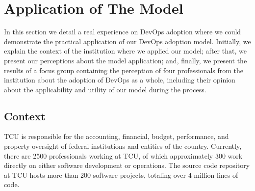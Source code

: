 \section{Application of The Model} \label{sec:TCU}

{
\color{blue}
In this section we detail a real experience on DevOps adoption where we could
demonstrate the practical application of our DevOps adoption model. Initially,
we explain the context of the institution where we applied our model; after that,
we present our perceptions about the model application; and,
finally, we present the results of a focus group containing the perception of
four professionals from the institution about the adoption of DevOps as a whole,
including their opinion about the applicability and utility of our model
during the process.
}

\subsection{Context}

TCU is responsible for the accounting, financial, budget, performance, and property
oversight of federal institutions and entities of the country. Currently, there are 2500
professionals working at TCU, of which approximately 300 work directly on either
software development or operations. The source code repository at TCU hosts
more than 200 software projects, totaling over 4 million lines of code.

